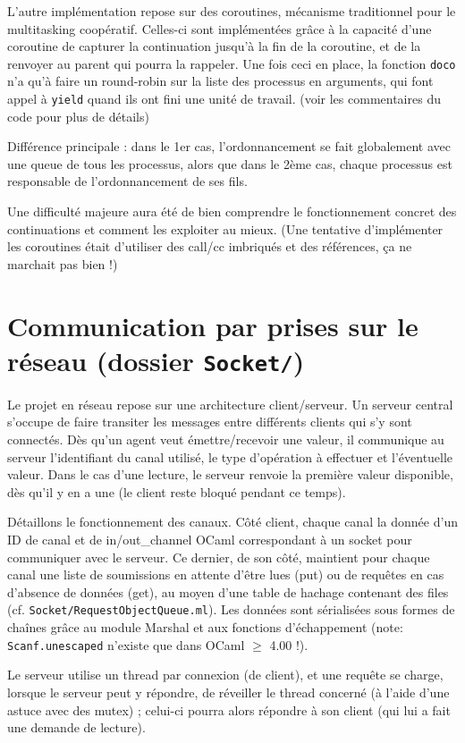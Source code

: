 \documentclass[a4paper, 11pt]{article}
\begin{document}
L'autre implémentation repose sur des coroutines, mécanisme
traditionnel pour le multitasking coopératif. Celles-ci sont
implémentées grâce à la capacité d'une coroutine de capturer la
continuation jusqu'à la fin de la coroutine, et de la
renvoyer au parent qui pourra la rappeler. Une fois ceci en place, la
fonction \texttt{doco} n'a qu'à faire un round-robin sur la liste
des processus en arguments, qui font appel à \texttt{yield} quand ils
ont fini une unité de travail. (voir les commentaires du code pour
plus de détails)

Différence principale : dans le 1er cas, l'ordonnancement se fait
globalement avec une queue de tous les processus, alors que dans le
2ème cas, chaque processus est responsable de l'ordonnancement de ses
fils.

Une difficulté majeure aura été de bien comprendre le fonctionnement
concret des continuations et comment les exploiter au mieux. (Une
tentative d'implémenter les coroutines était d'utiliser des call/cc
imbriqués et des références, ça ne marchait pas bien !)


\section*{Communication par prises sur le réseau (dossier \texttt{Socket/})}

Le projet en réseau repose sur une architecture client/serveur. Un
serveur central s'occupe de faire transiter les messages entre
différents clients qui s'y sont connectés. Dès qu'un agent veut émettre/recevoir
une valeur, il communique au serveur l'identifiant du canal utilisé,
le type d'opération à effectuer et l'éventuelle valeur. Dans le cas
d'une lecture, le serveur renvoie la première valeur disponible, dès
qu'il y en a une (le client reste bloqué pendant ce temps).

Détaillons le fonctionnement des canaux. Côté client, chaque canal la
donnée d'un ID de canal et de in/out\_channel OCaml correspondant à un
socket pour communiquer avec le serveur. Ce dernier, de son côté,
maintient pour chaque canal une liste de soumissions en attente d'être
lues (put) ou de requêtes en cas d'absence de données (get), au moyen
d'une table de hachage contenant des files
(cf. \texttt{Socket/RequestObjectQueue.ml}). Les données sont
sérialisées sous formes de chaînes grâce au module Marshal et aux
fonctions d'échappement (note: \texttt{Scanf.unescaped} n'existe que
dans OCaml $\geq$ 4.00 !).

Le serveur utilise un thread par connexion (de client), et une requête
se charge, lorsque le serveur peut y répondre, de réveiller le thread
concerné (à l'aide d'une astuce avec des mutex) ; celui-ci pourra
alors répondre à son client (qui lui a fait une demande de lecture).
\end{document}

